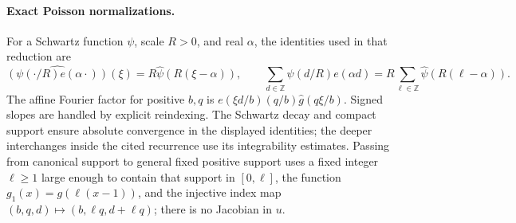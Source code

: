 \documentclass[11pt,a4paper,oneside]{article}
\theoremstyle{definition}
\newcommand{\Z}{\mathbb Z}
\newcommand{\Hhat}{\widehat}
\numberwithin{equation}{section}
\begin{document}
\paragraph{Exact Poisson normalizations.}
For a Schwartz function $\psi$, scale $R>0$, and real $\alpha$, the identities used in that reduction are
\[
 \Hhat{(\psi(\cdot/R)e(\alpha\cdot))}(\xi)
       =R\Hhat\psi(R(\xi-\alpha)),\qquad
 \sum_{d\in\Z}\psi(d/R)e(\alpha d)
       =R\sum_{\ell\in\Z}\Hhat\psi(R(\ell-\alpha)).
\]
The affine Fourier factor for positive $b,q$ is
$e(\xi d/b)(q/b)\Hhat g(q\xi/b)$. Signed slopes are handled by
explicit reindexing. The Schwartz decay and compact support ensure absolute convergence in the displayed identities; the deeper interchanges inside the cited recurrence use its integrability estimates. Passing from canonical support to general fixed
positive support uses a fixed integer $\ell\ge1$ large enough to contain that support in $[0,\ell]$, the function $g_1(x)=g(\ell(x-1))$, and the injective index map
$(b,q,d)\mapsto(b,\ell q,d+\ell q)$; there is no Jacobian in $u$.
\end{document}
